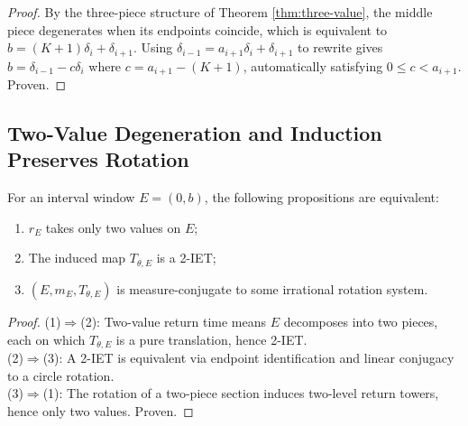 \begin{proof}
By the three-piece structure of Theorem \ref{thm:three-value}, the middle piece degenerates when its endpoints coincide, which is equivalent to $b=(K+1)\delta_i+\delta_{i+1}$. Using $\delta_{i-1}=a_{i+1}\delta_i+\delta_{i+1}$ to rewrite gives
$b=\delta_{i-1}-c\delta_i$ where $c=a_{i+1}-(K+1)$, automatically satisfying $0\le c<a_{i+1}$. Proven.
\end{proof}

\subsection{Two-Value Degeneration and Induction Preserves Rotation}

\begin{theorem}\label{thm:two-value-iet}
For an interval window $E=(0,b)$, the following propositions are equivalent:
\begin{enumerate}
  \item $r_E$ takes only two values on $E$;
  \item The induced map $T_{\theta,E}$ is a 2-IET;
  \item $(E,m_E,T_{\theta,E})$ is measure-conjugate to some irrational rotation system.
\end{enumerate}
\end{theorem}

\begin{proof}
(1)$\Rightarrow$(2): Two-value return time means $E$ decomposes into two pieces, each on which $T_{\theta,E}$ is a pure translation, hence 2-IET.\\
(2)$\Rightarrow$(3): A 2-IET is equivalent via endpoint identification and linear conjugacy to a circle rotation.\\
(3)$\Rightarrow$(1): The rotation of a two-piece section induces two-level return towers, hence only two values. Proven.
\end{proof}
